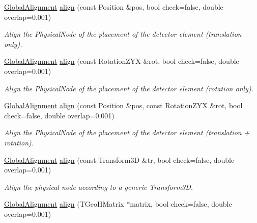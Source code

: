 \begin{DoxyCompactItemize}
\hyperlink{class_d_d4hep_1_1_alignments_1_1_global_alignment}{GlobalAlignment} \hyperlink{class_d_d4hep_1_1_alignments_1_1_global_detector_alignment_a5423eff6a3f3a03fc45c6563d82ee256}{align} (const Position \&pos, bool check=false, double overlap=0.001)
\begin{DoxyCompactList}\small\item\em Align the PhysicalNode of the placement of the detector element (translation only). \item\end{DoxyCompactList}\item 
\hyperlink{class_d_d4hep_1_1_alignments_1_1_global_alignment}{GlobalAlignment} \hyperlink{class_d_d4hep_1_1_alignments_1_1_global_detector_alignment_ae865aabbab6f92bff3bc6dd8c10898fc}{align} (const RotationZYX \&rot, bool check=false, double overlap=0.001)
\begin{DoxyCompactList}\small\item\em Align the PhysicalNode of the placement of the detector element (rotation only). \item\end{DoxyCompactList}\item 
\hyperlink{class_d_d4hep_1_1_alignments_1_1_global_alignment}{GlobalAlignment} \hyperlink{class_d_d4hep_1_1_alignments_1_1_global_detector_alignment_a11e7e399711724497cb9321e74e3e345}{align} (const Position \&pos, const RotationZYX \&rot, bool check=false, double overlap=0.001)
\begin{DoxyCompactList}\small\item\em Align the PhysicalNode of the placement of the detector element (translation + rotation). \item\end{DoxyCompactList}\item 
\hyperlink{class_d_d4hep_1_1_alignments_1_1_global_alignment}{GlobalAlignment} \hyperlink{class_d_d4hep_1_1_alignments_1_1_global_detector_alignment_af25045f4135b7688c2ec8df38a4f6128}{align} (const Transform3D \&tr, bool check=false, double overlap=0.001)
\begin{DoxyCompactList}\small\item\em Align the physical node according to a generic Transform3D. \item\end{DoxyCompactList}\item 
\hyperlink{class_d_d4hep_1_1_alignments_1_1_global_alignment}{GlobalAlignment} \hyperlink{class_d_d4hep_1_1_alignments_1_1_global_detector_alignment_adbf2906a23e458e6d1630fecfe72678c}{align} (TGeoHMatrix $\ast$matrix, bool check=false, double overlap=0.001)

\end{DoxyCompactItemize}
